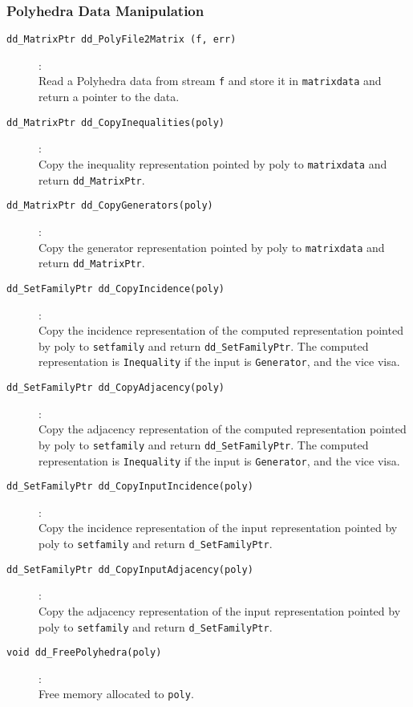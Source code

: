 \documentclass[11pt]{article}
\newcommand {\0} {{\bf 0}}
\begin{document}
\subsubsection{Polyhedra Data Manipulation}
\begin{description}

\item[{\tt dd\_MatrixPtr dd\_PolyFile2Matrix (f, err)}]:\\
Read a Polyhedra data from stream {\tt f} and store it in {\tt matrixdata}
and return a pointer to the data.

\item[{\tt dd\_MatrixPtr dd\_CopyInequalities(poly)}]:\\
Copy the inequality representation pointed by poly to {\tt matrixdata}
and return {\tt dd\_MatrixPtr}.

\item[{\tt dd\_MatrixPtr dd\_CopyGenerators(poly)}]:\\
Copy the generator representation pointed by poly to {\tt matrixdata}
and return {\tt dd\_MatrixPtr}.

\item[{\tt dd\_SetFamilyPtr dd\_CopyIncidence(poly)}]:\\
Copy the incidence representation of the computed representation
pointed by poly to {\tt setfamily}
and return {\tt dd\_SetFamilyPtr}.  The computed representation is
{\tt Inequality} if the input is {\tt Generator}, and the vice visa.

\item[{\tt dd\_SetFamilyPtr dd\_CopyAdjacency(poly)}]:\\
Copy the adjacency representation of the computed representation
pointed by poly to {\tt setfamily}
and return {\tt dd\_SetFamilyPtr}.  The computed representation is
{\tt Inequality} if the input is {\tt Generator}, and the vice visa.

\item[{\tt dd\_SetFamilyPtr dd\_CopyInputIncidence(poly)}]:\\
Copy the incidence representation of the input representation
pointed by poly to {\tt setfamily}
and return {\tt d\_SetFamilyPtr}.

\item[{\tt dd\_SetFamilyPtr dd\_CopyInputAdjacency(poly)}]:\\
Copy the adjacency representation of the input representation
pointed by poly to {\tt setfamily}
and return {\tt d\_SetFamilyPtr}.

\item[{\tt void dd\_FreePolyhedra(poly)}]:\\
Free memory allocated to {\tt poly}.

\end{description}
\end{document}

